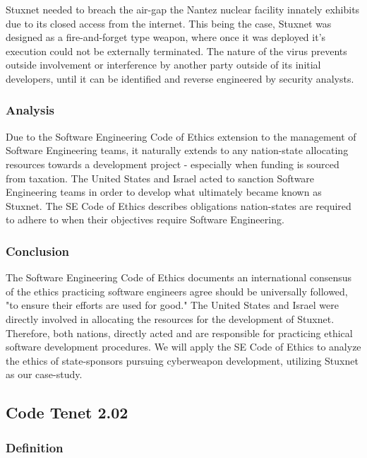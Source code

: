 \documentclass[12pt]{article}
\begin{document}
\begin{multicols}{2}
Stuxnet needed to breach the air-gap the Nantez nuclear facility innately exhibits due to its closed access from the internet. This being the case, Stuxnet was designed as a fire-and-forget type weapon, where once it was deployed it's execution could not be externally terminated. The nature of the virus prevents outside involvement or interference by another party outside of its initial developers, until it can be identified and reverse engineered by security analysts.\cite{stuxnetFireandForget}


\subsubsection{Analysis}
Due to the Software Engineering Code of Ethics extension to the management of Software Engineering teams, it naturally extends to any nation-state allocating resources towards a development project - especially when funding is sourced from taxation. The United States and Israel acted to sanction Software Engineering teams in order to develop what ultimately became known as Stuxnet. The SE Code of Ethics describes obligations nation-states are required to adhere to when their objectives require Software Engineering.

\subsubsection{Conclusion}

The Software Engineering Code of Ethics documents an international consensus of the ethics practicing software engineers agree should be universally followed, "to ensure their efforts are used for good."\cite{softwareEngineeringCodeOfEthics} The United States and Israel were directly involved in allocating the resources for the development of Stuxnet. Therefore, both nations, directly acted and are responsible for practicing ethical software development procedures. We will apply the SE Code of Ethics to analyze the ethics of state-sponsors pursuing cyberweapon development, utilizing Stuxnet as our case-study.

\subsection{Code Tenet 2.02}

\subsubsection{Definition}


\end{multicols}
\end{document}
